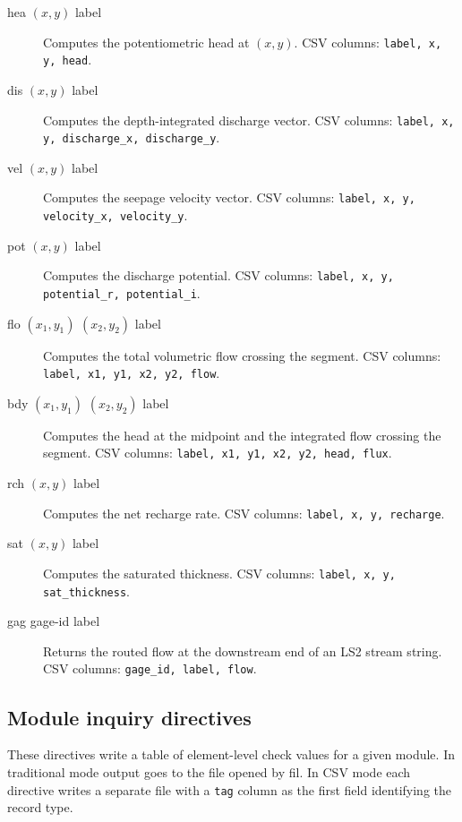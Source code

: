 \begin{description}
\item[\textsf{hea} $(x,y)$ label] Computes the potentiometric head at $(x,y)$. CSV columns:
  \texttt{label, x, y, head}.
\item[\textsf{dis} $(x,y)$ label] Computes the depth-integrated discharge vector. CSV columns:
  \texttt{label, x, y, discharge\_x, discharge\_y}.
\item[\textsf{vel} $(x,y)$ label] Computes the seepage velocity vector. CSV columns:
  \texttt{label, x, y, velocity\_x, velocity\_y}.
\item[\textsf{pot} $(x,y)$ label] Computes the discharge potential. CSV columns:
  \texttt{label, x, y, potential\_r, potential\_i}.
\item[\textsf{flo} $(x_1,y_1)$ $(x_2,y_2)$ label] Computes the total volumetric flow crossing
  the segment. CSV columns: \texttt{label, x1, y1, x2, y2, flow}.
\item[\textsf{bdy} $(x_1,y_1)$ $(x_2,y_2)$ label] Computes the head at the midpoint and the
  integrated flow crossing the segment. CSV columns: \texttt{label, x1, y1, x2, y2, head, flux}.
\item[\textsf{rch} $(x,y)$ label] Computes the net recharge rate. CSV columns:
  \texttt{label, x, y, recharge}.
\item[\textsf{sat} $(x,y)$ label] Computes the saturated thickness. CSV columns:
  \texttt{label, x, y, sat\_thickness}.
\item[\textsf{gag} gage-id label] Returns the routed flow at the downstream end of an LS2 stream
  string. CSV columns: \texttt{gage\_id, label, flow}.
\end{description}

\subsection{Module inquiry directives}

These directives write a table of element-level check values for a given module. In traditional
mode output goes to the file opened by \textsf{fil}. In CSV mode each directive writes a
separate file with a \texttt{tag} column as the first field identifying the record type.

